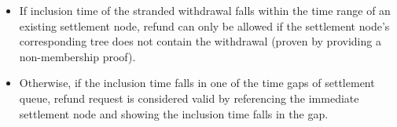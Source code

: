 \documentclass[../midgard.tex]{subfiles}
\begin{document}
\begin{description}
\begin{enumerate}
        \begin{itemize}
          \item If inclusion time of the stranded withdrawal falls within the time range of an existing settlement node, refund can only be allowed if the settlement node's corresponding tree does not contain the withdrawal (proven by providing a non-membership proof).
          \item Otherwise, if the inclusion time falls in one of the time gaps of settlement queue, refund request is considered valid by referencing the immediate settlement node and showing the inclusion time falls in the gap.
        \end{itemize}
    \end{enumerate}
\end{description}
\end{document}
